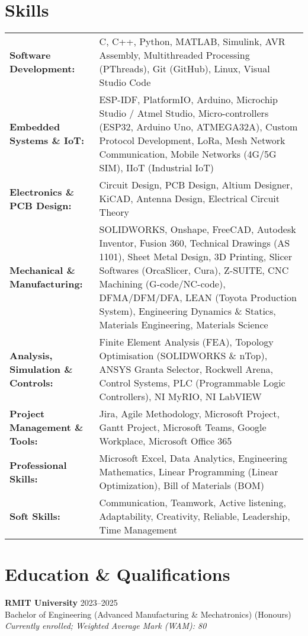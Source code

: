 \documentclass[11pt,a4paper]{article}
\begin{document}
\section{Skills}
{ %
\renewcommand{\arraystretch}{1.8} %
\begin{tabularx}{\textwidth}{@{} >{\bfseries}l X @{}}
    Software Development: & C, C++, Python, MATLAB, Simulink, AVR Assembly, Multithreaded Processing (PThreads), Git (GitHub), Linux, Visual Studio Code \\
    Embedded Systems \& IoT: & ESP-IDF, PlatformIO, Arduino, Microchip Studio / Atmel Studio, Micro-controllers (ESP32, Arduino Uno, ATMEGA32A), Custom Protocol Development, LoRa, Mesh Network Communication, Mobile Networks (4G/5G SIM), IIoT (Industrial IoT) \\
    Electronics \& PCB Design: & Circuit Design, PCB Design, Altium Designer, KiCAD, Antenna Design, Electrical Circuit Theory \\
    Mechanical \& Manufacturing: & SOLIDWORKS, Onshape, FreeCAD, Autodesk Inventor, Fusion 360, Technical Drawings (AS 1101), Sheet Metal Design, 3D Printing, Slicer Softwares (OrcaSlicer, Cura), Z-SUITE, CNC Machining (G-code/NC-code), DFMA/DFM/DFA, LEAN (Toyota Production System), Engineering Dynamics \& Statics, Materials Engineering, Materials Science \\
    Analysis, Simulation \& Controls: & Finite Element Analysis (FEA), Topology Optimisation (SOLIDWORKS \& nTop), ANSYS Granta Selector, Rockwell Arena, Control Systems, PLC (Programmable Logic Controllers), NI MyRIO, NI LabVIEW \\
    Project Management \& Tools: & Jira, Agile Methodology, Microsoft Project, Gantt Project, Microsoft Teams, Google Workplace, Microsoft Office 365 \\
    Professional Skills: & Microsoft Excel, Data Analytics, Engineering Mathematics, Linear Programming (Linear Optimization), Bill of Materials (BOM)  \\
    Soft Skills: & Communication, Teamwork, Active listening, Adaptability, Creativity, Reliable, Leadership, Time Management \\
\end{tabularx}
} %

\section{Education \& Qualifications}
\textbf{RMIT University} \hfill {2023--2025} \\
Bachelor of Engineering (Advanced Manufacturing \& Mechatronics) (Honours) \\
\textit{Currently enrolled; Weighted Average Mark (WAM): 80}
\newpage %
\end{document}
